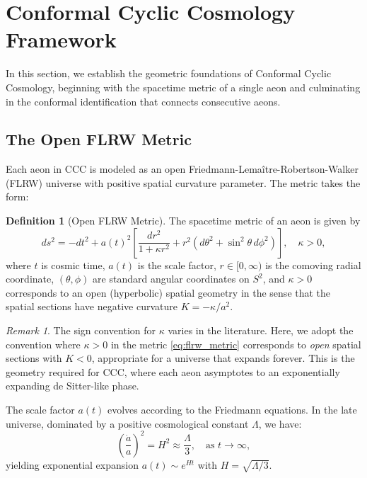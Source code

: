 \documentclass[11pt,a4paper]{article}
\theoremstyle{plain}
\theoremstyle{definition}
\newtheorem{definition}[theorem]{Definition}
\theoremstyle{remark}
\newtheorem{remark}[theorem]{Remark}
\begin{document}
\section{Conformal Cyclic Cosmology Framework}\label{sec:ccc_framework}

In this section, we establish the geometric foundations of Conformal Cyclic Cosmology, beginning with the spacetime metric of a single aeon and culminating in the conformal identification that connects consecutive aeons.

\subsection{The Open FLRW Metric}

Each aeon in CCC is modeled as an open Friedmann-Lema\^itre-Robertson-Walker (FLRW) universe with positive spatial curvature parameter. The metric takes the form:

\begin{definition}[Open FLRW Metric]\label{def:flrw}
The spacetime metric of an aeon is given by
\begin{equation}\label{eq:flrw_metric}
    ds^2 = -dt^2 + a(t)^2 \left[ \frac{dr^2}{1 + \kappa r^2} + r^2 \left( d\theta^2 + \sin^2\theta \, d\phi^2 \right) \right], \quad \kappa > 0,
\end{equation}
where $t$ is cosmic time, $a(t)$ is the scale factor, $r \in [0, \infty)$ is the comoving radial coordinate, $(\theta, \phi)$ are standard angular coordinates on $S^2$, and $\kappa > 0$ corresponds to an open (hyperbolic) spatial geometry in the sense that the spatial sections have negative curvature $K = -\kappa/a^2$.
\end{definition}

\begin{remark}
The sign convention for $\kappa$ varies in the literature. Here, we adopt the convention where $\kappa > 0$ in the metric \eqref{eq:flrw_metric} corresponds to \emph{open} spatial sections with $K < 0$, appropriate for a universe that expands forever. This is the geometry required for CCC, where each aeon asymptotes to an exponentially expanding de Sitter-like phase.
\end{remark}

The scale factor $a(t)$ evolves according to the Friedmann equations. In the late universe, dominated by a positive cosmological constant $\Lambda$, we have:
\begin{equation}\label{eq:friedmann_late}
    \left( \frac{\dot{a}}{a} \right)^2 = H^2 \approx \frac{\Lambda}{3}, \quad \text{as } t \to \infty,
\end{equation}
yielding exponential expansion $a(t) \sim e^{Ht}$ with $H = \sqrt{\Lambda/3}$.
\end{document}

